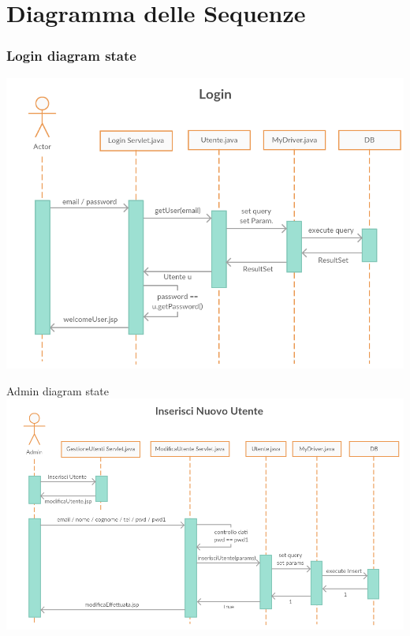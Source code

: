 \documentclass[a4paper,12pt]{beamer}
\begin{document}
\pagebreak

\section{Diagramma delle Sequenze}
\begin{frame}
\frametitle{Login diagram state}
\includegraphics[scale=0.4]{LoginSeq.png}
\end{frame}

\begin{frame}{Admin diagram state}
\includegraphics[scale=0.32]{AdminSeq.png}
\end{frame}
\end{document}
